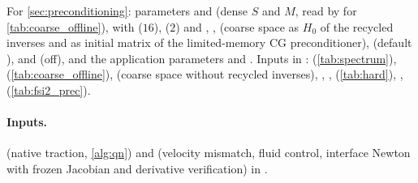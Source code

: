 \documentclass[11pt,a4paper]{article}
\theoremstyle{definition}
\theoremstyle{remark}
\newcommand{\M}{M}
\begin{document}
For \cref{sec:preconditioning}: parameters  and
 (dense $S$ and $\M$, read by
 for \cref{tab:coarse_offline}), 
with  ($16$),  ($2$) and
, ,
 (coarse space as $H_0$ of the recycled inverses and as initial
matrix of the limited-memory CG preconditioner),  (default ),
 and  (off), and the application
parameters  and . Inputs in
:  (\cref{tab:spectrum}), 
(\cref{tab:coarse_offline}),  (coarse
space without recycled inverses), , ,  (\cref{tab:hard}),
,  (\cref{tab:fsi2_prec}).

\paragraph{Inputs.}  (native traction, \cref{alg:qn}) and
 (velocity mismatch, fluid control, interface Newton
with frozen Jacobian and derivative verification) in
.
\end{document}
